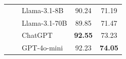 \begin{table}
{\begin{tabular}{@{}c|c|l|c|c@{}}
                                                &                             & Llama-3.1-8B                  & 90.24          & 71.19          \\
                                                &                             & Llama-3.1-70B                 & 89.85          & 71.47          \\
                                                &                             & ChatGPT                       & \textbf{92.55}          & 73.23          \\
                                                &                             & GPT-4o-mini                   & 92.23 & \textbf{74.05} \\ \bottomrule
        \end{tabular}%
    }
\end{table}
